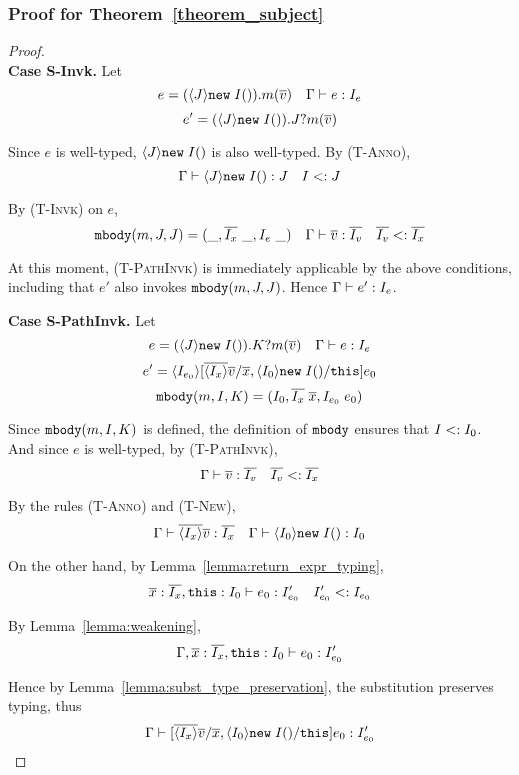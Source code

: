 \subsubsection{Proof for Theorem~\ref{theorem_subject}}
\begin{proof} ~\\
\indent \textbf{Case S-Invk.} Let
   $$e = (\langle J \rangle\texttt{new} \; I()).m(\overline{v}) \quad \Gamma \; {\vdash} \; e : I_e$$
   $$e' = (\langle J \rangle\texttt{new} \; I()).J?m(\overline{v})$$
   
Since $e$ is well-typed, $\langle J \rangle\texttt{new} \; I()$ is also well-typed. By \textsc{(T-Anno)},
  $$\Gamma \; {\vdash} \; \langle J \rangle\texttt{new} \; I() : J \quad I <: J$$
  
By \textsc{(T-Invk)} on $e$,
  $$\texttt{mbody}(m, J, J) = (\_, \overline{I_x}\ \_, I_e\ \_) \quad \Gamma \; {\vdash} \; \overline{v} : \overline{I_v} \quad \overline{I_v}  <: \overline{I_x}$$
  
At this moment, \textsc{(T-PathInvk)} is immediately applicable by the above conditions, including that $e'$ also invokes $\texttt{mbody}(m, J, J)$. Hence $\Gamma \; {\vdash} \; e' : I_e$.

\textbf{Case S-PathInvk.} Let
  $$e = (\langle J \rangle\texttt{new} \; I()).K?m(\overline{v}) \quad \Gamma \; {\vdash} \; e : I_e$$
  $$e' = \langle I_{e_0} \rangle[\overline{\langle I_x \rangle} \overline{v}/\overline{x}, \langle I_0 \rangle\texttt{new} \; I()/\texttt{this}]e_0$$
  $$\texttt{mbody}(m, I, K) = (I_0, \overline{I_x} \; \overline{x}, I_{e_0} \; e_0)$$

Since $\texttt{mbody}(m, I, K)$ is defined, the definition of $\texttt{mbody}$ ensures that $I <: I_0$. And since $e$ is well-typed, by \textsc{(T-PathInvk)},
  $$\Gamma \; {\vdash} \; \overline{v} : \overline{I_v} \quad \overline{I_v} <: \overline{I_x}$$

By the rules \textsc{(T-Anno)} and  \textsc{(T-New)},
  $$\Gamma \; {\vdash} \; \overline{\langle I_x \rangle}\overline{v} : \overline{I_x} \quad \Gamma \; {\vdash} \; \langle I_0 \rangle\texttt{new} \; I() : I_0$$
  
On the other hand, by Lemma~\ref{lemma:return_expr_typing},
  $$\overline{x} : \overline{I_x}, \texttt{this}: I_0 \; {\vdash} \; e_0 : I'_{e_0} \quad I'_{e_0} <: I_{e_0}$$
  
By Lemma~\ref{lemma:weakening},
  $$\Gamma, \overline{x} : \overline{I_x}, \texttt{this}: I_0 \; {\vdash} \; e_0 : I'_{e_0}$$

Hence by Lemma~\ref{lemma:subst_type_preservation}, the substitution preserves typing, thus
  $$\Gamma \; {\vdash} \; [\overline{\langle I_x \rangle} \overline{v}/\overline{x}, \langle I_0 \rangle\texttt{new} \; I()/\texttt{this}]e_0 : I'_{e_0}$$
  

\end{proof}
